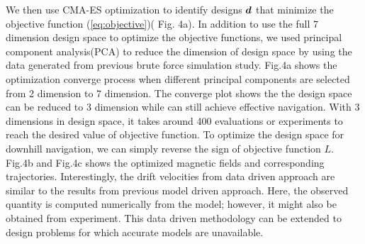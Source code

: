 We then use CMA-ES optimization \autocite{hansen2016cma,dou2019autonomous} to identify designs $\boldsymbol{d}$ that minimize the objective function (\ref{eq:objective})( Fig. 4a). In addition to use the full 7 dimension design space to optimize the objective functions, we used principal component analysis(PCA) to reduce the dimension of design space by using the data generated from previous brute force simulation study. Fig.4a shows the optimization converge process when different  principal components are selected from 2 dimension to 7 dimension. The converge plot shows the the design space can be reduced to 3 dimension while can still achieve effective navigation. With 3 dimensions in design space, it takes around 400 evaluations or experiments to reach the desired value of objective function. To optimize the design space for downhill navigation, we can simply reverse the sign of objective function $L$. Fig.4b and Fig.4c shows the optimized magnetic fields and corresponding trajectories. Interestingly, the drift velocities from data driven approach are similar to the results from previous  model driven approach. Here, the observed quantity is computed numerically from the model; however, it might also be obtained from experiment. This data driven methodology can be extended to design problems for which accurate models are unavailable. 
